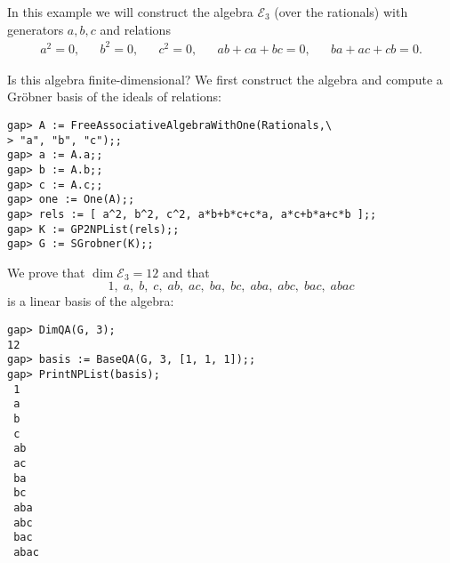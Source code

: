 \begin{example}
	\label{example:FK3}
	In this example we will construct the algebra $\mathcal{E}_3$ (over the
	rationals) with generators $a,b,c$ and relations
\begin{align*}
	a^2=0,&& 
	b^2=0,&&
	c^2=0,&&
	ab+ca+bc=0,&&
	ba+ac+cb=0.
 \end{align*}

Is this algebra finite-dimensional? We first construct the algebra and compute
a Gr\"obner basis of the ideals of relations:
\begin{lstlisting}
gap> A := FreeAssociativeAlgebraWithOne(Rationals,\
> "a", "b", "c");;
gap> a := A.a;;
gap> b := A.b;;
gap> c := A.c;;
gap> one := One(A);;
gap> rels := [ a^2, b^2, c^2, a*b+b*c+c*a, a*c+b*a+c*b ];;
gap> K := GP2NPList(rels);;
gap> G := SGrobner(K);;
\end{lstlisting}

We prove that $\dim\mathcal{E}_3=12$ and that 
\[
1,\;
a,\;
b ,\;
c ,\;
ab ,\;
ac ,\;
ba ,\;
bc ,\;
aba ,\;
abc ,\;
bac ,\;
abac
\]
is a linear basis of the algebra: 

\begin{lstlisting}
gap> DimQA(G, 3);
12
gap> basis := BaseQA(G, 3, [1, 1, 1]);;
gap> PrintNPList(basis);
 1 
 a 
 b 
 c 
 ab 
 ac 
 ba 
 bc 
 aba 
 abc 
 bac 
 abac 
\end{lstlisting}
%
%
%
\end{example}

